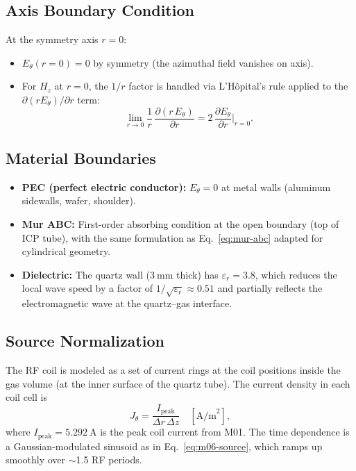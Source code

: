 \documentclass[11pt,a4paper]{report}
\newcommand{\dr}{\Delta r}
\newcommand{\dz}{\Delta z}
\begin{document}
\subsection{Axis Boundary Condition}

At the symmetry axis $r = 0$:
\begin{itemize}
  \item $E_\theta(r=0) = 0$ by symmetry (the azimuthal field vanishes on axis).
  \item For $H_z$ at $r = 0$, the $1/r$ factor is handled via L'H\^opital's rule applied to the $\partial(rE_\theta)/\partial r$ term:
  \begin{equation}
    \lim_{r \to 0} \frac{1}{r}\,\frac{\partial(r\,E_\theta)}{\partial r} = 2\,\frac{\partial E_\theta}{\partial r}\bigg|_{r=0}.
  \end{equation}
\end{itemize}

\subsection{Material Boundaries}

\begin{itemize}
  \item \textbf{PEC (perfect electric conductor):} $E_\theta = 0$ at metal walls (aluminum sidewalls, wafer, shoulder).
  \item \textbf{Mur ABC:} First-order absorbing condition at the open boundary (top of ICP tube), with the same formulation as Eq.~\eqref{eq:mur-abc} adapted for cylindrical geometry.
  \item \textbf{Dielectric:} The quartz wall ($\SI{3}{\milli\meter}$ thick) has $\varepsilon_r = 3.8$, which reduces the local wave speed by a factor of $1/\sqrt{\varepsilon_r} \approx 0.51$ and partially reflects the electromagnetic wave at the quartz--gas interface.
\end{itemize}

\subsection{Source Normalization}

The RF coil is modeled as a set of current rings at the coil positions inside the gas volume (at the inner surface of the quartz tube).  The current density in each coil cell is
\begin{equation}
  J_\theta = \frac{I_\mathrm{peak}}{\dr\,\dz} \quad [\mathrm{A/m}^2],
  \label{eq:J-coil}
\end{equation}
where $I_\mathrm{peak} = \SI{5.292}{\ampere}$ is the peak coil current from M01.  The time dependence is a Gaussian-modulated sinusoid as in Eq.~\eqref{eq:m06-source}, which ramps up smoothly over $\sim$1.5 RF periods.
\end{document}
